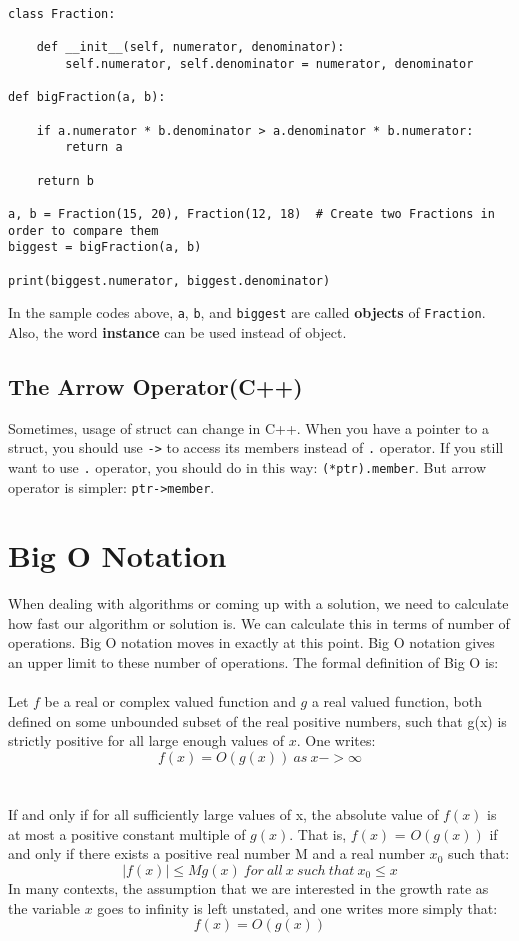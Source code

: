 \documentclass[12pt]{article}
\begin{document}
\begin{verbatim}
class Fraction:

    def __init__(self, numerator, denominator):
        self.numerator, self.denominator = numerator, denominator

def bigFraction(a, b):

    if a.numerator * b.denominator > a.denominator * b.numerator:
        return a

    return b

a, b = Fraction(15, 20), Fraction(12, 18)  # Create two Fractions in order to compare them
biggest = bigFraction(a, b)

print(biggest.numerator, biggest.denominator)
\end{verbatim}

In the sample codes above, \lstinline{a}, \lstinline{b}, and \lstinline{biggest} are called \textbf{objects} of \lstinline{Fraction}. Also, the word \textbf{instance} can be used instead of object.

\subsection{The Arrow Operator(C++)}
Sometimes, usage of struct can change in C++. When you have a pointer to a struct, you should use \lstinline{->} to access its members instead of \lstinline{.} operator. If you still want to use \lstinline{.} operator, you should do in this way: \lstinline{(*ptr).member}. But arrow operator is simpler: \lstinline{ptr->member}.

\section{Big O Notation}

When dealing with algorithms or coming up with a solution, we need to calculate how fast our algorithm or solution is. We can calculate this in terms of number of operations. Big O notation moves in exactly at this point. Big O notation gives an upper limit to these number of operations. The formal definition of Big O is\cite{bigo}:\\ \ \\
Let $f$ be a real or complex valued function and $g$ a real valued function, both defined on some unbounded subset of the real positive numbers, such that g(x) is strictly positive for all large enough values of $x$. One writes:\\
$$f(x) = O(g(x)) \ as\  x -> \infty$$ \\ \ \\
If and only if for all sufficiently large values of x, the absolute value of $f(x)$ is at most a positive constant multiple of $g(x)$. That is, $f(x)$ = $O(g(x))$ if and only if there exists a positive real number M and a real number $x_0$ such that: \\
$$|f(x)| \leq Mg(x)\ for \ all\ x\ such\ that\ x_0 \leq x$$
In many contexts, the assumption that we are interested in the growth rate as the variable $x$ goes to infinity is left unstated, and one writes more simply that:
$$f(x) = O(g(x))$$
\end{document}
